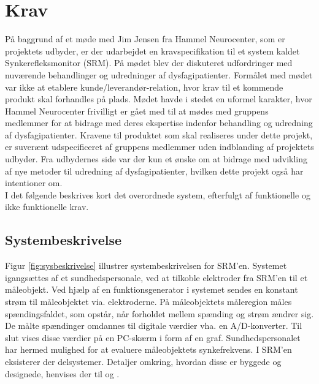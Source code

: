 \chapter{Krav} \label{Af:Krav}

På baggrund af et møde med Jim Jensen fra Hammel Neurocenter, som er projektets udbyder, er der udarbejdet en kravspecifikation til et system kaldet Synkerefleksmonitor (SRM). På mødet blev der diskuteret udfordringer med nuværende behandlinger og udredninger af dysfagipatienter. Formålet med mødet var ikke at etablere kunde/leverandør-relation, hvor krav til et kommende produkt skal forhandles på plads. Mødet havde i stedet en uformel karakter, hvor Hammel Neurocenter frivilligt er gået med til at mødes med gruppens medlemmer for at bidrage med deres ekspertise indenfor behandling og udredning af dysfagipatienter. Kravene til produktet som skal realiseres under dette projekt, er suverænt udspecificeret af gruppens medlemmer uden indblanding af projektets udbyder. Fra udbydernes side var der kun et ønske om at bidrage med udvikling af nye metoder til udredning af dysfagipatienter, hvilken dette projekt også har intentioner om. \\

I det følgende beskrives kort det overordnede system, efterfulgt af funktionelle og ikke funktionelle krav.  

\section{Systembeskrivelse}



Figur \ref{fig:sysbeskrivelse} illustrer systembeskrivelsen for SRM'en. Systemet igangsættes af et sundhedspersonale, ved at tilkoble elektroder fra SRM'en til et måleobjekt. Ved hjælp af en funktionsgenerator i systemet sendes en konstant strøm til måleobjektet via. elektroderne. På måleobjektets måleregion måles spændingsfaldet, som opstår, når forholdet mellem spænding og strøm ændrer sig. De målte spændinger omdannes til digitale værdier vha.  en A/D-konverter. Til slut vises disse værdier på en PC-skærm i form af en graf. Sundhedspersonalet har hermed mulighed for at evaluere måleobjektets synkefrekvens. I SRM'en eksisterer der delsystemer. Detaljer omkring, hvordan disse er byggede og designede, henvises der til  og . 

 


 

